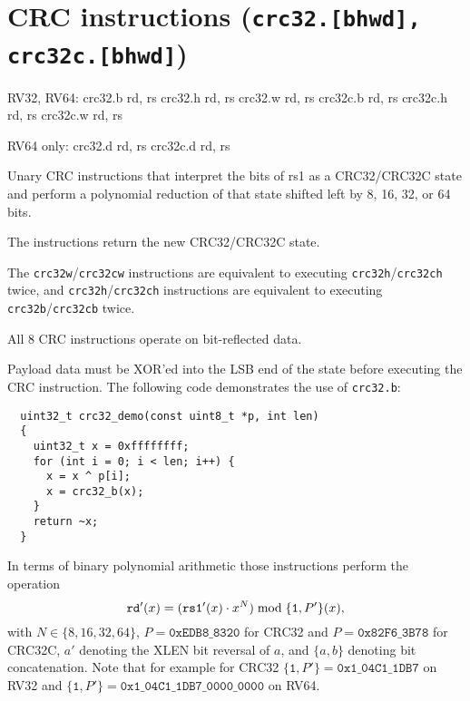 \section{CRC instructions (\texttt{crc32.[bhwd], crc32c.[bhwd]})}

\begin{rvb}
  RV32, RV64:
    crc32.b rd, rs
    crc32.h rd, rs
    crc32.w rd, rs
    crc32c.b rd, rs
    crc32c.h rd, rs
    crc32c.w rd, rs

  RV64 only:
    crc32.d rd, rs
    crc32c.d rd, rs
\end{rvb}

Unary CRC instructions that interpret the bits of rs1 as a CRC32/CRC32C state
and perform a polynomial reduction of that state shifted left by 8, 16, 32, or
64 bits.

The instructions return the new CRC32/CRC32C state.

The \texttt{crc32w}/\texttt{crc32cw} instructions are equivalent to executing
\texttt{crc32h}/\texttt{crc32ch} twice, and \texttt{crc32h}/\texttt{crc32ch}
instructions are equivalent to executing \texttt{crc32b}/\texttt{crc32cb}
twice.

All 8 CRC instructions operate on bit-reflected data.



Payload data must be XOR'ed into the LSB end of the state before executing the
CRC instruction. The following code demonstrates the use of \texttt{crc32.b}:

\begin{minipage}{\linewidth}
\begin{verbatim}
  uint32_t crc32_demo(const uint8_t *p, int len)
  {
    uint32_t x = 0xffffffff;
    for (int i = 0; i < len; i++) {
      x = x ^ p[i];
      x = crc32_b(x);
    }
    return ~x;
  }
\end{verbatim}
\end{minipage}

In terms of binary polynomial arithmetic those instructions perform the operation
$$ \texttt{rd}'(x) = (\texttt{rs1}'(x) \cdot x^N) \; \textrm{mod} \; \{\texttt{1}, P'\}(x)\textrm, $$
with $N \in \{8, 16, 32, 64\}$,
$P = \texttt{0xEDB8\_8320}$ for CRC32 and $P = \texttt{0x82F6\_3B78}$ for CRC32C,
$a'$ denoting the XLEN bit reversal of $a$,
and $\{a, b\}$ denoting bit concatenation.
Note that for example for CRC32 $\{\texttt{1}, P'\} = \texttt{0x1\_04C1\_1DB7}$
on RV32 and $\{\texttt{1}, P'\} = \texttt{0x1\_04C1\_1DB7\_0000\_0000}$ on RV64.

